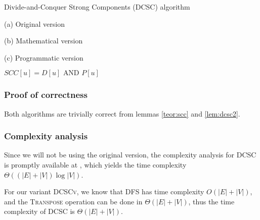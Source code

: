 \begin{algorithm}[h]
    \caption{Divide-and-Conquer Strong Components (DCSC) algorithm}
    \label{alg-dcsc}
    \begin{minipage}[t]{0.49\linewidth}
        (a) Original version
        \begin{algorithmic}[1]
                 
                 
                 
                \State {}
            \EndFunction
        \end{algorithmic}
    \end{minipage}
    \begin{minipage}[t]{0.49\linewidth}
        (b) Mathematical version
        \begin{algorithmic}[1]
                 
                 
                \State {}
            \EndFunction
        \end{algorithmic}
        (c) Programmatic version
        \begin{algorithmic}[1]
                 
                 
                 {$SCC[u] = D[u] \text{ AND } P[u]$}
                \EndFor
                \State {}
            \EndFunction
        \end{algorithmic}
    \end{minipage}
\end{algorithm}
\subsubsection{Proof of correctness}
Both algorithms are trivially correct from lemmas \ref{teor:scc} and \ref{lem:dcsc2}.
\subsubsection{Complexity analysis}
Since we will not be using the original version, the complexity analysis for \textsc{DCSC} is promptly available at \cite{fleischer-dcsc}, which yields the time complexity $\Theta((|E|+|V|) \log |V|)$.\par
For our variant \textsc{DCSCv}, we know that \textsc{DFS} has time complexity $O(|E|+|V|)$, and the \textsc{Transpose} operation can be done in $\Theta(|E|+|V|)$, thus the time complexity of \textsc{DCSC} is $\Theta(|E|+|V|)$.
